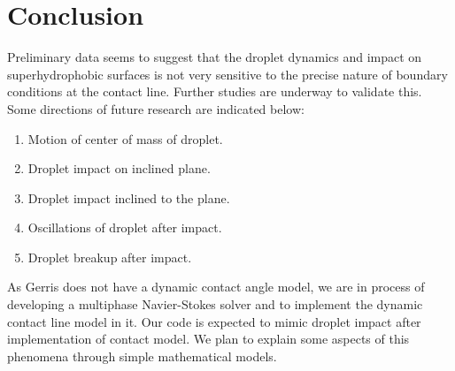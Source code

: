 \section{Conclusion}
Preliminary data seems to suggest that the droplet dynamics and impact on superhydrophobic surfaces is not very sensitive to the precise nature of boundary conditions at the contact line.
Further studies are underway to validate this. Some directions of future research are indicated below:
\begin{enumerate}
\item Motion of center of mass of droplet. 
 \item Droplet impact on inclined plane.
 \item Droplet impact inclined to the plane.
 \item Oscillations of droplet after impact.
 \item Droplet breakup after impact.
\end{enumerate}
As Gerris does not have a dynamic contact angle model, we are in process of developing a multiphase Navier-Stokes solver and to implement 
the dynamic contact line model in it. Our code is expected to mimic droplet impact after implementation of contact model. We plan to explain
some aspects of this phenomena through simple mathematical models.


